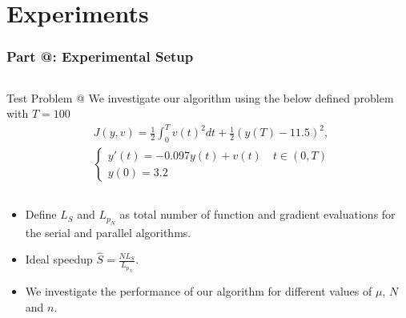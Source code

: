 \documentclass[9pt]{beamer}
\makeatletter
\newcommand*{\rom}[1]{\expandafter\@slowromancap\romannumeral #1@}
\makeatother
\begin{document}
\section{Experiments}
\begin{frame}
\frametitle{\textbf{ Part \rom{4}:} Experimental Setup}
\begin{columns}
\begin{block}{Test Problem \rom{2}}
We investigate our algorithm using the below defined problem with $T=100$
{\small\begin{align*}
&J(y,v) = \frac{1}{2}\int_0^{T}v(t)^2dt + \frac{1}{2}(y(T)-11.5)^2, \\
&\left\{
     \begin{array}{lr}
       	y'(t)=-0.097y(t) + v(t) \quad t\in(0,T)\\
       	y(0)=3.2
     \end{array}
   \right. 
\end{align*}}
\end{block}
\end{columns}
\begin{itemize}
\item<1->{Define $L_S$ and $L_{p_N}$ as total number of function and gradient evaluations for the serial and parallel algorithms.}
\item<1->{Ideal speedup $\hat{S}=\frac{N L_S}{L_{p_N}}$.}
\item<1->{We investigate the performance of our algorithm for different values of $\mu$, $N$ and $n$.}
\end{itemize}
\end{frame}
\end{document}
